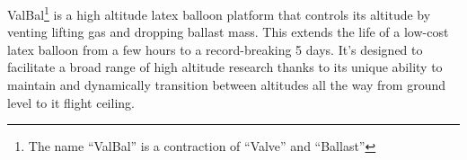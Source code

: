\documentclass[12pt, twocolumn]{article}
\begin{document}
\thispagestyle{empty}\sffamily

\noindent ValBal\footnote{\sffamily The name ``ValBal'' is a contraction of ``Valve'' and ``Ballast''} is a high altitude latex balloon platform that controls its altitude by venting lifting gas and dropping ballast mass. This extends the life of a low-cost latex balloon from a few hours to a record-breaking 5 days. It's designed to facilitate a broad range of high altitude research thanks to its unique ability to maintain and dynamically transition between altitudes all the way from ground level to it flight ceiling.

\end{document}

